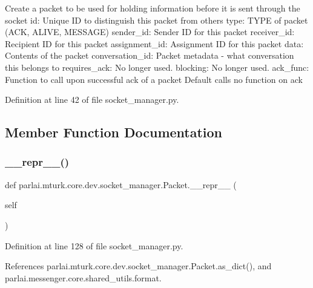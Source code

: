 \begin{DoxyVerb}Create a packet to be used for holding information before it is
sent through the socket
id:               Unique ID to distinguish this packet from others
type:             TYPE of packet (ACK, ALIVE, MESSAGE)
sender_id:        Sender ID for this packet
receiver_id:      Recipient ID for this packet
assignment_id:    Assignment ID for this packet
data:             Contents of the packet
conversation_id:  Packet metadata - what conversation this belongs to
requires_ack:     No longer used.
blocking:         No longer used.
ack_func:         Function to call upon successful ack of a packet
           Default calls no function on ack
\end{DoxyVerb}
 

Definition at line 42 of file socket\+\_\+manager.\+py.



\subsection{Member Function Documentation}
\mbox{\label{classparlai_1_1mturk_1_1core_1_1dev_1_1socket__manager_1_1Packet_add796297ba2304710fade256bf5e0adf}} 
\subsubsection{\texorpdfstring{\+\_\+\+\_\+repr\+\_\+\+\_\+()}{\_\_repr\_\_()}}
{\footnotesize\ttfamily def parlai.\+mturk.\+core.\+dev.\+socket\+\_\+manager.\+Packet.\+\_\+\+\_\+repr\+\_\+\+\_\+ (\begin{DoxyParamCaption}\item[{}]{self }\end{DoxyParamCaption})}



Definition at line 128 of file socket\+\_\+manager.\+py.



References parlai.\+mturk.\+core.\+dev.\+socket\+\_\+manager.\+Packet.\+as\+\_\+dict(), and parlai.\+messenger.\+core.\+shared\+\_\+utils.\+format.

